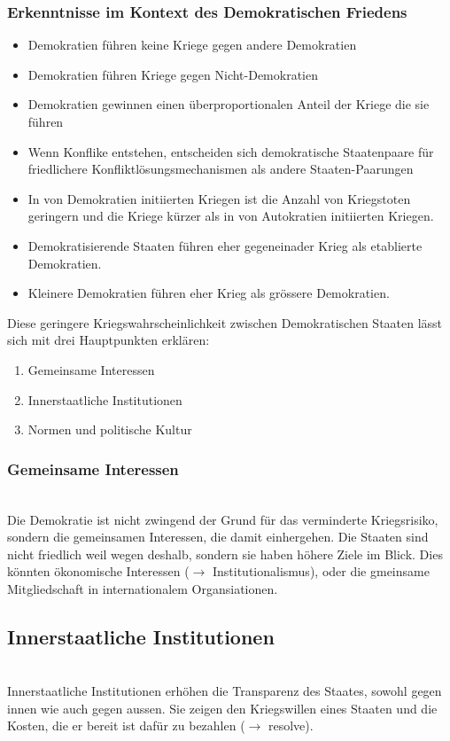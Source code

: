 \documentclass[a4paper, 11pt]{article}
\begin{document}
\subsubsection{Erkenntnisse im Kontext des Demokratischen Friedens}
\begin{itemize}
    \item Demokratien führen keine Kriege gegen andere Demokratien
    \item Demokratien führen Kriege gegen Nicht-Demokratien
    \item Demokratien gewinnen einen überproportionalen Anteil der Kriege die sie führen
    \item Wenn Konflike entstehen, entscheiden sich demokratische Staatenpaare für friedlichere Konfliktlösungsmechanismen als andere Staaten-Paarungen
    \item In von Demokratien initiierten Kriegen ist die Anzahl von Kriegstoten geringern und die Kriege kürzer als in von Autokratien initiierten Kriegen.
    \item Demokratisierende Staaten führen eher gegeneinader Krieg als etablierte Demokratien.
    \item Kleinere Demokratien führen eher Krieg als grössere Demokratien.
\end{itemize}

Diese geringere Kriegswahrscheinlichkeit zwischen Demokratischen Staaten lässt sich mit drei Hauptpunkten erklären:

\begin{enumerate}
    \item Gemeinsame Interessen
    \item Innerstaatliche Institutionen
    \item Normen und politische Kultur
\end{enumerate}

\subsubsection{Gemeinsame Interessen} \mbox{}\\
Die Demokratie ist nicht zwingend der Grund für das verminderte Kriegsrisiko, sondern die gemeinsamen Interessen, die damit einhergehen. Die Staaten sind nicht friedlich weil wegen deshalb, sondern sie haben höhere Ziele im Blick. Dies könnten ökonomische Interessen ($\rightarrow$ Institutionalismus), oder die gmeinsame Mitgliedschaft in internationalem Organsiationen. 

\subsection{Innerstaatliche Institutionen} \mbox{}\\
Innerstaatliche Institutionen erhöhen die Transparenz des Staates, sowohl gegen innen wie auch gegen aussen. Sie zeigen den Kriegswillen eines Staaten und die Kosten, die er bereit ist dafür zu bezahlen ($\rightarrow$ resolve).
\end{document}
